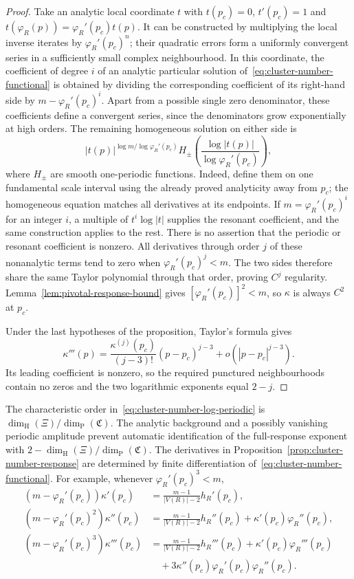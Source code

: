 \documentclass[scheme=plain,11pt]{ctexart}
\theoremstyle{definition}
\theoremstyle{remark}
\newcommand{\dimhaus}{\dim_{\mathrm H}}
\begin{document}
\begin{proof}
Take an analytic local coordinate $t$ with $t(p_c)=0$, $t'(p_c)=1$ and
$t(\varphi_R(p))=\varphi_R'(p_c)t(p)$.
It can be constructed by multiplying the local inverse iterates by $\varphi_R'(p_c)^n$; their quadratic errors form a uniformly convergent series in a sufficiently small complex neighbourhood.
In this coordinate, the coefficient of degree $i$ of an analytic particular solution of~\eqref{eq:cluster-number-functional} is obtained by dividing the corresponding coefficient of its right-hand side by $m-\varphi_R'(p_c)^i$.
Apart from a possible single zero denominator, these coefficients define a convergent series, since the denominators grow exponentially at high orders.
The remaining homogeneous solution on either side is
\begin{equation}\label{eq:cluster-number-log-periodic}
 |t(p)|^{\log m/\log\varphi_R'(p_c)}
 H_\pm\!\left(\frac{\log|t(p)|}{\log\varphi_R'(p_c)}\right),
\end{equation}
where $H_\pm$ are smooth one-periodic functions.
Indeed, define them on one fundamental scale interval using the already proved analyticity away from $p_c$; the homogeneous equation matches all derivatives at its endpoints.
If $m=\varphi_R'(p_c)^i$ for an integer $i$, a multiple of $t^i\log|t|$ supplies the resonant coefficient, and the same construction applies to the rest.
There is no assertion that the periodic or resonant coefficient is nonzero.
All derivatives through order $j$ of these nonanalytic terms tend to zero when $\varphi_R'(p_c)^j<m$.
The two sides therefore share the same Taylor polynomial through that order, proving $C^j$ regularity.
Lemma~\ref{lem:pivotal-response-bound} gives $[\varphi_R'(p_c)]^2<m$, so $\kappa$ is always $C^2$ at $p_c$.

Under the last hypotheses of the proposition, Taylor's formula gives
\[
 \kappa'''(p)=\frac{\kappa^{(j)}(p_c)}{(j-3)!}(p-p_c)^{j-3}
 +o(|p-p_c|^{j-3}).
\]
Its leading coefficient is nonzero, so the required punctured neighbourhoods contain no zeros and the two logarithmic exponents equal $2-j$.
\end{proof}

The characteristic order in~\eqref{eq:cluster-number-log-periodic} is $\dimhaus(\Xi)/\dim_{\mathrm P}(\mathfrak C)$.
The analytic background and a possibly vanishing periodic amplitude prevent automatic identification of the full-response exponent with $2-\dimhaus(\Xi)/\dim_{\mathrm P}(\mathfrak C)$.
The derivatives in Proposition~\ref{prop:cluster-number-response} are determined by finite differentiation of~\eqref{eq:cluster-number-functional}.
For example, whenever $\varphi_R'(p_c)^3<m$,
\begin{align*}
 (m-\varphi_R'(p_c))\kappa'(p_c)
 &=\frac{m-1}{|V(R)|-2}h_R'(p_c),\\
 (m-\varphi_R'(p_c)^2)\kappa''(p_c)
 &=\frac{m-1}{|V(R)|-2}h_R''(p_c)
   +\kappa'(p_c)\varphi_R''(p_c),\\
 (m-\varphi_R'(p_c)^3)\kappa'''(p_c)
 &=\frac{m-1}{|V(R)|-2}h_R'''(p_c)
   +\kappa'(p_c)\varphi_R'''(p_c)\\
 &\quad+3\kappa''(p_c)\varphi_R'(p_c)\varphi_R''(p_c).
\end{align*}
\end{document}
